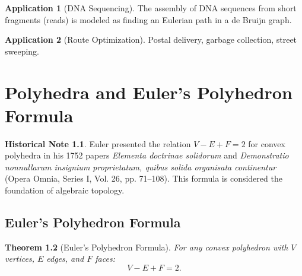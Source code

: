 \documentclass[11pt,a4paper,twoside]{book}
\theoremstyle{eulerstyle}
\newtheorem{theorem}{Theorem}[chapter]
\theoremstyle{definition}
\newtheorem{historical}[theorem]{Historical Note}
\newtheorem{application}[theorem]{Application}
\begin{document}
\begin{application}[DNA Sequencing]
The assembly of DNA sequences from short fragments (reads) is modeled as finding an Eulerian path in a de Bruijn graph.
\end{application}

\begin{application}[Route Optimization]
Postal delivery, garbage collection, street sweeping.
\end{application}

\chapter{Polyhedra and Euler's Polyhedron Formula}
\label{ch:polyhedra}

\begin{historical}
Euler presented the relation $V - E + F = 2$ for convex polyhedra in his 1752 papers \emph{Elementa doctrinae solidorum} and \emph{Demonstratio nonnullarum insignium proprietatum, quibus solida organisata continentur} (Opera Omnia, Series I, Vol. 26, pp. 71--108). This formula is considered the foundation of algebraic topology. \cite{euler1752}\end{historical}

\section{Euler's Polyhedron Formula}

\begin{theorem}[Euler's Polyhedron Formula]
For any convex polyhedron with $V$ vertices, $E$ edges, and $F$ faces:
\[
V - E + F = 2.
\]
\end{theorem}
\end{document}
